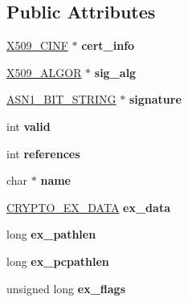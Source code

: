 \subsection*{Public Attributes}
\begin{DoxyCompactItemize}
\item 
\mbox{\label{structx509__st_abbae6a9fb14b3145b04b98f24128be71}} 
\hyperlink{structx509__cinf__st}{X509\+\_\+\+C\+I\+NF} $\ast$ {\bfseries cert\+\_\+info}
\item 
\mbox{\label{structx509__st_a90d06c88fff740923082fa98b7b86b27}} 
\hyperlink{structX509__algor__st}{X509\+\_\+\+A\+L\+G\+OR} $\ast$ {\bfseries sig\+\_\+alg}
\item 
\mbox{\label{structx509__st_a8a1e43923e1855fb1dbfe15730cd5e7f}} 
\hyperlink{structasn1__string__st}{A\+S\+N1\+\_\+\+B\+I\+T\+\_\+\+S\+T\+R\+I\+NG} $\ast$ {\bfseries signature}
\item 
\mbox{\label{structx509__st_a1e506073c0b53c10a6007f5fa9428c35}} 
int {\bfseries valid}
\item 
\mbox{\label{structx509__st_ab1114b325664bca1cdfd6854f247a4d5}} 
int {\bfseries references}
\item 
\mbox{\label{structx509__st_a447f3d7de20099a3a45fcc361a2d8f02}} 
char $\ast$ {\bfseries name}
\item 
\mbox{\label{structx509__st_a388ec405fa7f267e4ce5fbcbc9ccbc91}} 
\hyperlink{structcrypto__ex__data__st}{C\+R\+Y\+P\+T\+O\+\_\+\+E\+X\+\_\+\+D\+A\+TA} {\bfseries ex\+\_\+data}
\item 
\mbox{\label{structx509__st_a9e9ea838b4395a05a70485526f05a152}} 
long {\bfseries ex\+\_\+pathlen}
\item 
\mbox{\label{structx509__st_a80c2e990274c6d80a0d2e8bc87850d59}} 
long {\bfseries ex\+\_\+pcpathlen}
\item 
\mbox{\label{structx509__st_afc5106add019789df9b25ab6a1ff07ce}} 
unsigned long {\bfseries ex\+\_\+flags}
\item 

\end{DoxyCompactItemize}
